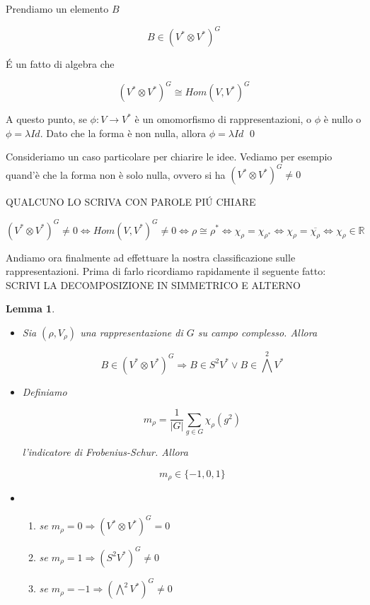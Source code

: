 \documentclass[11pt]{article}
\theoremstyle{plain}
\newtheorem{lemma}[thm]{Lemma}
\theoremstyle{definition}
\theoremstyle{remark}
\newcommand{\R}{\mathbb{R}}
\newcommand{\dsum}{\displaystyle\sum}
\begin{document}
Prendiamo un elemento $B$

\[B \in \left(V^* \otimes V^*\right)^G \]

\'E un fatto di algebra che 

\[\left(V^* \otimes V^*\right)^G \cong Hom(V, V^*)^G \]

A questo punto, se $\phi: V\to V^*$ è un omomorfismo di rappresentazioni, o $\phi$ è nullo o $\phi = \lambda Id$. Dato che la forma è non nulla, allora $\phi = \lambda Id$  \qed 


Consideriamo un caso particolare per chiarire le idee. Vediamo per esempio quand'è che la forma non è solo nulla, ovvero si ha $\left(V^* \otimes V^*\right)^G \neq 0$

QUALCUNO LO SCRIVA CON PAROLE PI\'U CHIARE

\[ \left(V^* \otimes V^*\right)^G \neq 0 \Leftrightarrow Hom(V, V^*) ^G \neq 0 \Leftrightarrow \rho \cong \rho^* \Leftrightarrow \chi_\rho = \chi_{\rho^*} \Leftrightarrow \chi_{\rho} = \overline{\chi_{\rho}} \Leftrightarrow \chi_\rho \in \R\]


Andiamo ora finalmente ad effettuare la nostra classificazione sulle rappresentazioni. Prima di farlo ricordiamo rapidamente il seguente fatto: SCRIVI LA DECOMPOSIZIONE IN SIMMETRICO E ALTERNO




\begin{lemma}
\begin{itemize}
\item Sia $(\rho, V_\rho)$ una rappresentazione di $G$ su campo complesso. Allora 

\[ B \in (V^* \otimes V^*)^G \Rightarrow B \in S^2V^* \vee B \in \bigwedge ^2 V^*\]

\item Definiamo 

\[ m_\rho = \dfrac{1}{|G|} \dsum_{g \in G} \chi_{\rho}(g^2)\]

l'indicatore di Frobenius-Schur. Allora

\[ m_\rho \in \{-1, 0, 1 \} \]

\item{ \begin{enumerate}

\item se $m_\rho = 0 \Rightarrow (V^*\otimes V^*)^G = 0$
\item se $m_\rho = 1 \Rightarrow (S^2 V^*)^G \neq 0$
\item se $m_\rho = -1 \Rightarrow (\bigwedge^2 V^*)^G \neq 0$
\end{enumerate}
}

\end{itemize}
\end{lemma}
\end{document}
